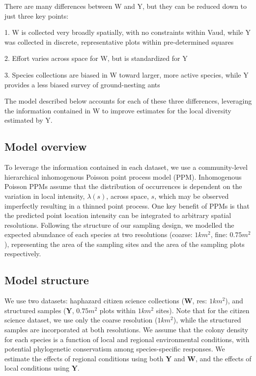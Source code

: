 \documentclass[10pt,a4paper,draft]{article}
\begin{document}

There are many differences between W and Y, but they can be reduced down to just three key points:

1. W is collected very broadly spatially, with no constraints within Vaud, while Y was collected in discrete, representative plots within pre-determined squares

2. Effort varies across space for W, but is standardized for Y

3. Species collections are biased in W toward larger, more active species, while Y provides a less biased survey of ground-nesting ants

The model described below accounts for each of these three differences, leveraging the information contained in W to improve estimates for the local diversity estimated by Y.

\subsection{Model overview}
To leverage the information contained in each dataset, we use a community-level hierarchical inhomogenous Poisson point process model (PPM). Inhomogenous Poisson PPMs assume that the distribution of occurrences is dependent on the variation in local intensity, $\lambda(s)$, across space, $s$, which may be observed imperfectly resulting in a thinned point process. One key benefit of PPMs is that the predicted point location intensity can be integrated to arbitrary spatial resolutions. Following the structure of our sampling design, we modelled the expected abundance of each species at two resolutions (coarse: $1 km^2$, fine: $0.75 m^2$), representing the area of the sampling sites and the area of the sampling plots respectively.

\subsection{Model structure}
We use two datasets: haphazard citizen science collections ($\textbf{W}$, res: $1 km^2$), and structured samples ($\textbf{Y}$, $0.75 m^2$ plots within $1 km^2$ sites). Note that for the citizen science dataset, we use only the coarse resolution ($1 km^2$), while the structured samples are incorporated at both resolutions. We assume that the colony density for each species is a function of local and regional environmental conditions, with potential phylogenetic conservatism among species-specific responses. We estimate the effects of regional conditions using both $\textbf{Y}$ and $\textbf{W}$, and the effects of local conditions using $\textbf{Y}$.
\end{document}
